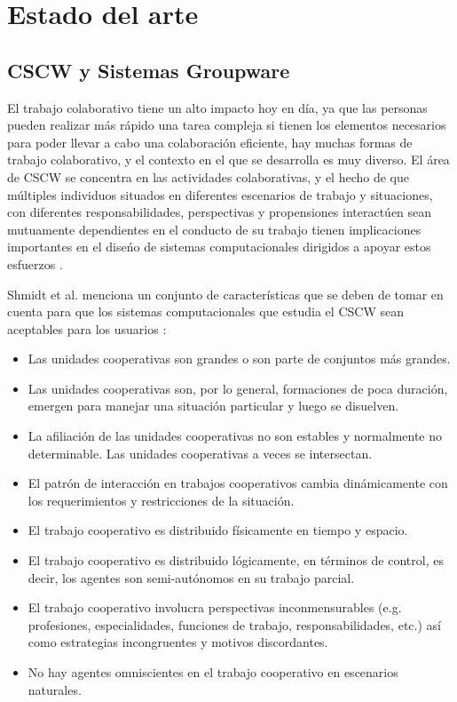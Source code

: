 \section{Estado del arte}
\subsection{CSCW y Sistemas Groupware}
El trabajo colaborativo tiene un alto impacto hoy en d\'ia, ya que las personas pueden realizar m\'as r\'apido una tarea compleja si tienen los elementos necesarios para poder llevar a cabo una colaboraci\'on eficiente, hay muchas formas de trabajo colaborativo, y el contexto en el que se desarrolla es muy diverso. El \'area de CSCW se concentra en las actividades colaborativas, y el hecho de que m\'ultiples individuos situados en diferentes escenarios de trabajo y situaciones, con diferentes responsabilidades, perspectivas y propensiones interact\'uen sean mutuamente dependientes en el conducto de su trabajo tienen implicaciones importantes en el dise\'no de sistemas computacionales dirigidos a apoyar estos esfuerzos \cite{schmidt1992taking}.

Shmidt et al. menciona un conjunto de caracter\'isticas que se deben de tomar en cuenta para que los sistemas computacionales que estudia el CSCW sean aceptables para los usuarios \cite{schmidt1992taking}:
\begin{itemize}
\item Las unidades cooperativas son grandes o son parte de conjuntos m\'as grandes.
\item Las unidades cooperativas son, por lo general, formaciones de poca duraci\'on, emergen para manejar una situaci\'on particular y luego se disuelven.
\item La afiliaci\'on de las unidades cooperativas no son estables y normalmente no determinable. Las unidades cooperativas a veces se intersectan.
\item El patr\'on de interacci\'on en trabajos cooperativos cambia din\'amicamente con los requerimientos y restricciones de la situaci\'on.
\item El trabajo cooperativo es distribuido f\'isicamente en tiempo y espacio.
\item El trabajo cooperativo es distribuido l\'ogicamente, en t\'erminos de control, es decir, los agentes son semi-aut\'onomos en su trabajo parcial.
\item El trabajo cooperativo involucra perspectivas inconmensurables (e.g. profesiones, especialidades, funciones de trabajo, responsabilidades, etc.) as\'i como estrategias incongruentes y motivos discordantes.
\item No hay agentes omniscientes en el trabajo cooperativo en escenarios naturales.
\end{itemize}
